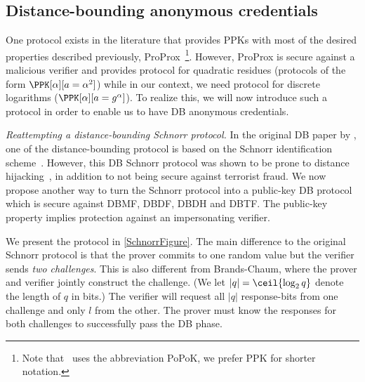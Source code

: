 \subsection{Distance-bounding anonymous credentials}%
\label{DB-anon-cred}

One protocol exists in the literature that provides \acp{PPK} with most of the 
desired properties described previously, ProProx~\cite{ProProx}\footnote{Note 
  that~\cite{ProProx} uses the abbreviation PoPoK, we prefer \acs{PPK} for 
  shorter notation.}.
However, ProProx is secure against a malicious verifier and provides  
protocol for quadratic residues (\ie protocols of the form \(\PPK[\alpha][a = 
  \alpha^2]\)) while in our context, we need  protocol for discrete 
logarithms (\ie \(\PPK[\alpha][a = g^\alpha]\)).
To realize this, we will now introduce such a protocol in order to enable us to have \ac{DB} anonymous credentials.


\emph{Reattempting a distance-bounding Schnorr protocol.}
In the original \ac{DB} paper by \citet{DistanceBounding}, one of the distance-bounding protocol is based on the Schnorr identification scheme~\cite{Schnorr}.
However, this \ac{DB} Schnorr protocol was shown to be prone to distance hijacking~\cite{DistanceHijacking}, in addition to not being secure against terrorist fraud.
We now propose another way to turn the Schnorr protocol into a
public-key \ac{DB} protocol which is secure against \ac{DBMF},
\ac{DBDF}, \ac{DBDH} and \ac{DBTF}.
The public-key property implies protection against an impersonating
verifier.

We present the protocol in \cref{SchnorrFigure}.
The main difference to the original Schnorr protocol is that the prover commits 
to one random value but the verifier sends \emph{two challenges}.
This is also different from Brands-Chaum, where the prover and verifier jointly 
construct the challenge.
(We let \(|q| = \ceil{\log_2 q}\) denote the length of \(q\) in bits.)
The verifier will request all \(|q|\) response-bits from one challenge and only 
\(l\) from the other.
The prover must know the responses for both challenges to successfully pass the 
\ac{DB} phase.

